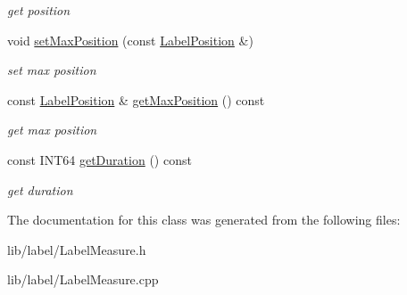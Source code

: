 \begin{DoxyCompactItemize}
\begin{DoxyCompactList}\small\item\em get position \end{DoxyCompactList}\item 
\hypertarget{classsinsy_1_1LabelMeasure_ac4908cfa8d721d71db8458bc7b978f49}{void \hyperlink{classsinsy_1_1LabelMeasure_ac4908cfa8d721d71db8458bc7b978f49}{set\-Max\-Position} (const \hyperlink{classsinsy_1_1LabelPosition}{\-Label\-Position} \&)}\label{classsinsy_1_1LabelMeasure_ac4908cfa8d721d71db8458bc7b978f49}

\begin{DoxyCompactList}\small\item\em set max position \end{DoxyCompactList}\item 
\hypertarget{classsinsy_1_1LabelMeasure_ad475e134e4ee84343e1217f63092f56c}{const \hyperlink{classsinsy_1_1LabelPosition}{\-Label\-Position} \& \hyperlink{classsinsy_1_1LabelMeasure_ad475e134e4ee84343e1217f63092f56c}{get\-Max\-Position} () const }\label{classsinsy_1_1LabelMeasure_ad475e134e4ee84343e1217f63092f56c}

\begin{DoxyCompactList}\small\item\em get max position \end{DoxyCompactList}\item 
\hypertarget{classsinsy_1_1LabelMeasure_a5105945476e55d5d94e8aaeb9425f052}{const \-I\-N\-T64 \hyperlink{classsinsy_1_1LabelMeasure_a5105945476e55d5d94e8aaeb9425f052}{get\-Duration} () const }\label{classsinsy_1_1LabelMeasure_a5105945476e55d5d94e8aaeb9425f052}

\begin{DoxyCompactList}\small\item\em get duration \end{DoxyCompactList}\end{DoxyCompactItemize}


\-The documentation for this class was generated from the following files\-:\begin{DoxyCompactItemize}
\item 
lib/label/\-Label\-Measure.\-h\item 
lib/label/\-Label\-Measure.\-cpp\end{DoxyCompactItemize}
